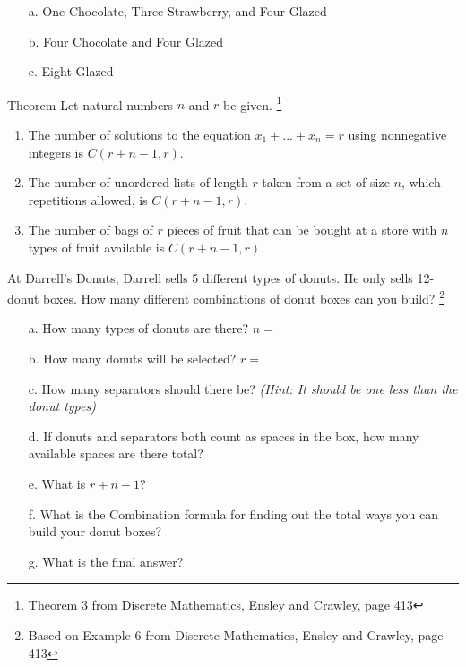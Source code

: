 {\begin{questionNOGRADE}{\thequestion}
        \begin{enumerate}
            \item[a.]   One Chocolate, Three Strawberry, and Four Glazed
            \item[b.]   Four Chocolate and Four Glazed
            \item[c.]   Eight Glazed
        \end{enumerate}
    \end{questionNOGRADE}

    \newpage

    \begin{intro}{Theorem}
        Let natural numbers $n$ and $r$ be given.
        \footnote{Theorem 3 from Discrete Mathematics, Ensley and Crawley, page 413}

        \begin{enumerate}
            \item   The number of solutions to the equation $x_{1} + ... + x_{n} = r$
            using nonnegative integers is $C(r + n - 1, r)$.
            \item   The number of unordered lists of length $r$ taken from a set of size $n$,
            which repetitions allowed, is $C(r + n - 1, r)$.
            \item   The number of bags of $r$ pieces of fruit that can be bought at a store with $n$
            types of fruit available is $C(r + n - 1, r)$.
        \end{enumerate}
    \end{intro}
    
    \begin{questionNOGRADE}{\thequestion}
        At Darrell's Donuts, Darrell sells 5 different types of donuts.
        He only sells 12-donut boxes. How many different combinations
        of donut boxes can you build?
        \footnote{Based on Example 6 from Discrete Mathematics, Ensley and Crawley, page 413}

        \begin{enumerate}
            \item[a.]   How many types of donuts are there? $n =$
            \item[b.]   How many donuts will be selected? $r = $
            \item[c.]   How many separators should there be?
                        \textit{(Hint: It should be one less than the donut types)}
            \item[d.]   If donuts and separators both count as spaces in the box,
                        how many available spaces are there total?
            \item[e.]   What is $r + n - 1$?
            \item[f.]   What is the Combination formula for finding out the total ways you can build your donut boxes?
            \item[g.]   What is the final answer?
        \end{enumerate}
    \end{questionNOGRADE}

}
